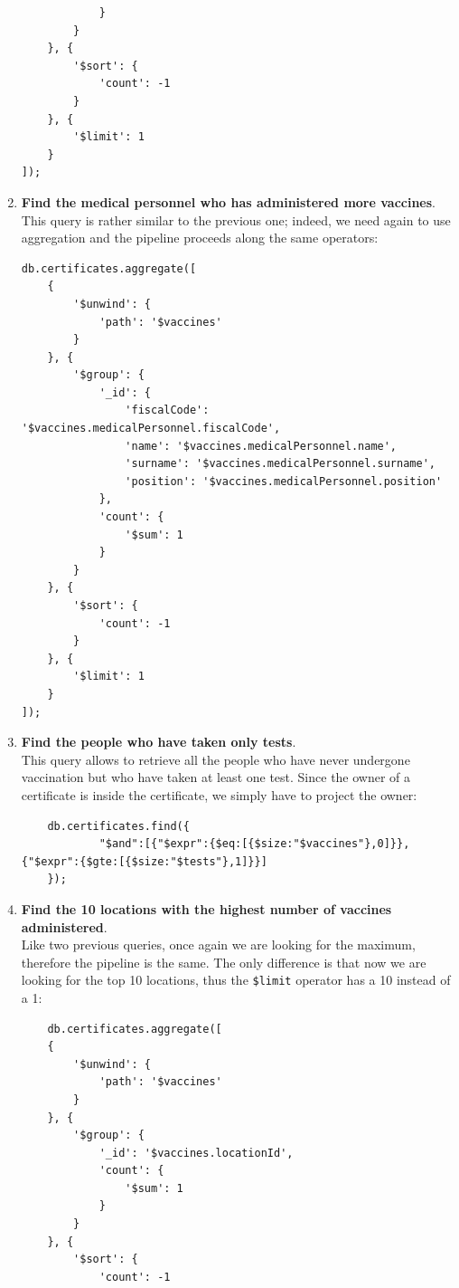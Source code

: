 \documentclass{article}
\begin{document}
\begin{enumerate}
\begin{lstlisting}
            }
        }
    }, {
        '$sort': {
            'count': -1
        }
    }, {
        '$limit': 1
    }
]);
\end{lstlisting}
    \item \textbf{Find the medical personnel who has administered more vaccines}.\\This query is rather similar to the previous one; indeed, we need again to use aggregation and the pipeline proceeds along the same operators:
    \begin{lstlisting}
db.certificates.aggregate([
    {
        '$unwind': {
            'path': '$vaccines'
        }
    }, {
        '$group': {
            '_id': {
                'fiscalCode': '$vaccines.medicalPersonnel.fiscalCode', 
                'name': '$vaccines.medicalPersonnel.name', 
                'surname': '$vaccines.medicalPersonnel.surname', 
                'position': '$vaccines.medicalPersonnel.position'
            }, 
            'count': {
                '$sum': 1
            }
        }
    }, {
        '$sort': {
            'count': -1
        }
    }, {
        '$limit': 1
    }
]);
\end{lstlisting}
    \item \textbf{Find the people who have taken only tests}.\\
    This query allows to retrieve all the people who have never undergone vaccination but who have taken at least one test. Since the owner of a certificate is inside the certificate, we simply have to project the owner: 
    \begin{lstlisting}
    db.certificates.find({
            "$and":[{"$expr":{$eq:[{$size:"$vaccines"},0]}},{"$expr":{$gte:[{$size:"$tests"},1]}}]
    });
\end{lstlisting}
    \item \textbf{Find the 10 locations with the highest number of vaccines administered}.\\
    Like two previous queries, once again we are looking for the maximum, therefore the pipeline is the same. The only difference is that now we are looking for the top 10 locations, thus the \verb|$limit| operator has a 10 instead of a 1:
    \begin{lstlisting}
    db.certificates.aggregate([
    {
        '$unwind': {
            'path': '$vaccines'
        }
    }, {
        '$group': {
            '_id': '$vaccines.locationId', 
            'count': {
                '$sum': 1
            }
        }
    }, {
        '$sort': {
            'count': -1

\end{lstlisting}
\end{enumerate}
\end{document}
